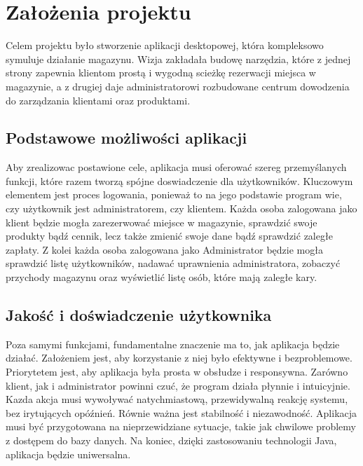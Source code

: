 \chapter{Założenia projektu}
\label{chap:Założenia projektu}
Celem projektu było stworzenie aplikacji desktopowej, która kompleksowo symuluje działanie magazynu.
Wizja zakładała budowę narzędzia, które z jednej strony zapewnia klientom prostą i wygodną scieżkę rezerwacji miejsca w magazynie, a z drugiej daje administratorowi rozbudowane centrum dowodzenia do zarządzania klientami oraz produktami. 

\section{Podstawowe możliwości aplikacji}
\label{sec:Wymagania funkcjonalne}
Aby zrealizowac postawione cele, aplikacja musi oferować szereg przemyślanych funkcji, które razem tworzą spójne doswiadczenie dla użytkowników. Kluczowym elementem jest proces logowania, ponieważ to na jego podstawie program wie, czy użytkownik jest administratorem, czy klientem. Każda osoba zalogowana jako klient będzie mogła zarezerwować miejsce w magazynie, sprawdzić swoje produkty bądź cennik, lecz także zmienić swoje dane bądź sprawdzić zaległe zapłaty. Z kolei każda osoba zalogowana jako Administrator będzie mogła sprawdzić listę użytkowników, nadawać uprawnienia administratora, zobaczyć przychody magazynu oraz wyświetlić listę osób, które mają zaległe kary. 

\section{Jakość i doświadczenie użytkownika}
\label{sec:Wymagania niefunkcjonalne}
Poza samymi funkcjami, fundamentalne znaczenie ma to, jak aplikacja będzie działać. Założeniem jest, aby korzystanie z niej było efektywne i bezproblemowe. Priorytetem jest, aby aplikacja była prosta w obsłudze i responsywna. Zarówno klient, jak i administrator powinni czuć,  że program działa płynnie i intuicyjnie. Kazda akcja musi wywoływać natychmiastową, przewidywalną reakcję systemu, bez irytujących opóźnień. Równie ważna jest stabilność i niezawodność. Aplikacja musi być przygotowana na nieprzewidziane sytuacje, takie jak chwilowe problemy z dostępem do bazy danych. Na koniec, dzięki zastosowaniu technologii Java, aplikacja będzie uniwersalna.

